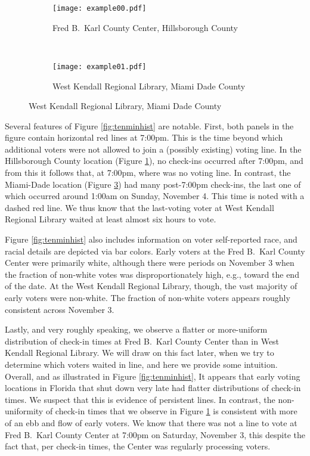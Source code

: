 \documentclass[12pt,titlepage]{article}
\begin{document}
\begin{figure}[!ht]
  \caption{Early voting check-in times on Saturday, November 3, 2012, in two Florida locations}
  \label{fig:tenminhist}
  \centering
  \begin{subfigure}[b]{\linewidth}
    \centering\texttt{[image: example00.pdf]}
    \caption{Fred B.\ Karl County Center, Hillsborough County}
    \label{fig:karlexample}
  \end{subfigure}%
  \\
  \begin{subfigure}[b]{\linewidth}
    \centering\texttt{[image: example01.pdf]}
    \caption{West Kendall Regional Library, Miami Dade County}
    \label{fig:kendallexample}
  \end{subfigure}
\end{figure}

Several features of Figure \ref{fig:tenminhist} are notable.  First,
both panels in the figure contain horizontal red lines at 7:00pm.
This is the time beyond which additional voters were not allowed to
join a (possibly existing) voting line.  In the Hillsborough County
location (Figure \ref{fig:karlexample}), no check-ins occurred after
7:00pm, and from this it follows that, at 7:00pm, where was no voting
line.  In contrast, the Miami-Dade location (Figure
\ref{fig:kendallexample}) had many post-7:00pm check-ins, the last one
of which occurred around 1:00am on Sunday, November 4.  This time is
noted with a dashed red line.  We thus know that the last-voting voter
at West Kendall Regional Library waited at least almost six hours to
vote.

Figure \ref{fig:tenminhist} also includes information on voter
self-reported race, and racial details are depicted via bar colors.
Early voters at the Fred B.\ Karl County Center were primarily white,
although there were periods on November 3 when the fraction of
non-white votes was disproportionately high, e.g., toward the end of
the date.  At the West Kendall Regional Library, though, the vast
majority of early voters were non-white.  The fraction of non-white
voters appears roughly consistent across November 3.

Lastly, and very roughly speaking, we observe a flatter or
more-uniform distribution of check-in times at Fred B.\ Karl County
Center than in West Kendall Regional Library.  We will draw on this
fact later, when we try to determine which voters waited in line, and
here we provide some intuition.  Overall, and as illustrated in Figure
\ref{fig:tenminhist}, It appears that early voting locations in
Florida that shut down very late had flatter distributions of check-in
times.  We suspect that this is evidence of persistent lines.  In
contrast, the non-uniformity of check-in times that we observe in
Figure \ref{fig:karlexample} is consistent with more of an ebb and
flow of early voters.  We know that there was not a line to vote at
Fred B.\ Karl County Center at 7:00pm on Saturday, November 3, this
despite the fact that, per check-in times, the Center was regularly
processing voters.
\end{document}
